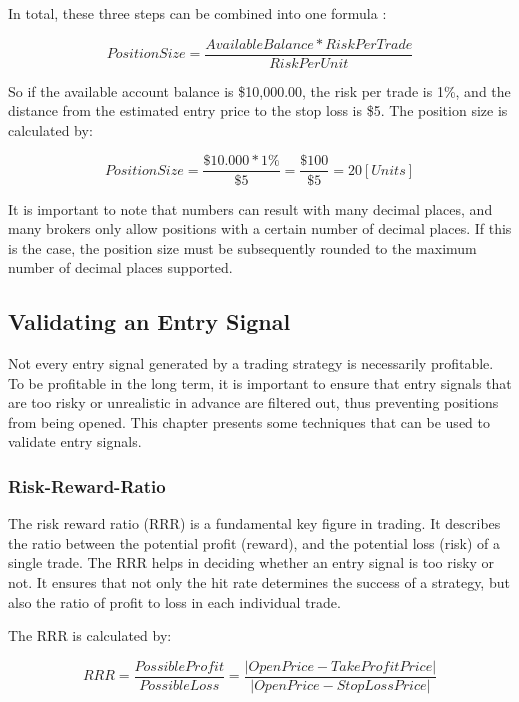 In total, these three steps can be combined into one formula \cite{britannica-position-size}:

\begin{equation}
    PositionSize = \frac{Available Balance*RiskPerTrade}{RiskPerUnit}
\end{equation}

So if the available account balance is \$10,000.00, the risk per trade is 1\%, and the distance from the estimated entry price to the stop loss is \$5.
The position size is calculated by:

\begin{equation}
    PositionSize = \frac{\$10.000*1\%}{\$5}=\frac{\$100}{\$5}=20 [Units]
\end{equation}

It is important to note that numbers can result with many decimal places, and many brokers only allow positions with a certain number of decimal places.
If this is the case, the position size must be subsequently rounded to the maximum number of decimal places supported.

\subsection{Validating an Entry Signal}

Not every entry signal generated by a trading strategy is necessarily profitable.
To be profitable in the long term, it is important to ensure that entry signals that are too risky or unrealistic in advance are filtered out, thus preventing positions from being opened.
This chapter presents some techniques that can be used to validate entry signals.

\subsubsection{Risk-Reward-Ratio}

The risk reward ratio (RRR) is a fundamental key figure in trading.
It describes the ratio between the potential profit (reward), and the potential loss (risk) of a single trade.
The RRR helps in deciding whether an entry signal is too risky or not.
It ensures that not only the hit rate determines the success of a strategy, but also the ratio of profit to loss in each individual trade.

The RRR is calculated by:

\begin{equation}
    RRR = \frac{PossibleProfit}{PossibleLoss} = \frac{|OpenPrice - TakeProfitPrice|}{|OpenPrice - StopLossPrice|}
\end{equation}

